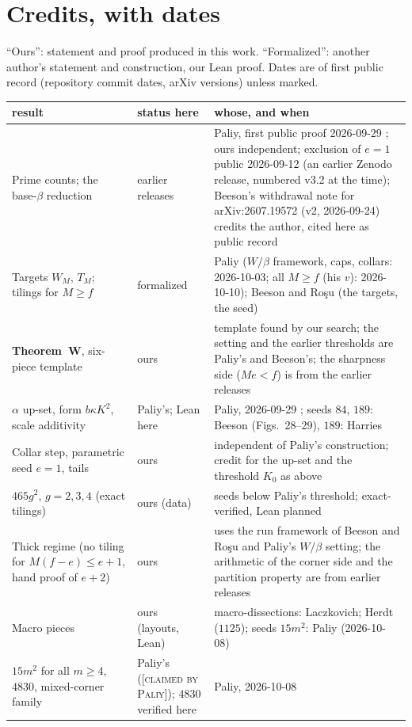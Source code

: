 \documentclass[11pt,reqno]{amsart}
\theoremstyle{plain}
\theoremstyle{definition}
\newcommand{\lab}[1]{\textup{[\textsc{#1}]}}
\newcommand{\CP}{\lab{claimed by Paliy}}
\begin{document}
\section{Credits, with dates}\label{sec:credits}
``Ours'': statement and proof produced in this work. ``Formalized'': another author's statement and construction, our Lean proof. Dates are of first public record (repository commit dates, arXiv versions) unless marked.
\begin{center}
\small
\begin{tabular}{@{}p{4.4cm}p{1.8cm}p{6.4cm}@{}}
\toprule
result & status here & whose, and when\\
\midrule
Prime counts; the base-$\beta$ reduction & earlier releases & Paliy, first public proof 2026-09-29 \cite{PaliyPrime}; ours independent; exclusion of $e=1$ public 2026-09-12 (an earlier Zenodo release, numbered v3.2 at the time); Beeson's withdrawal note for arXiv:2607.19572 (v2, 2026-09-24) \cite{BeesonWithdrawn} credits the author, cited here as public record\\
Targets $W_M$, $T_M$; tilings for $M\ge f$ & formalized & Paliy ($W/\beta$ framework, caps, collars: 2026-10-03; all $M\ge f$ (his $v$): 2026-10-10); Beeson and Ro\c{s}u (the targets, the seed)\\
\textbf{Theorem~W}, six-piece template & ours & template found by our search; the setting and the earlier thresholds are Paliy's and Beeson's; the sharpness side ($Me<f$) is from the earlier releases\\
$\alpha$ up-set, form $b\kappa K^2$, scale additivity & Paliy's; Lean here & Paliy, 2026-09-29 \cite{PaliyRepo}; seeds $84$, $189$: Beeson (Figs.~28--29), $189$: Harries\\
Collar step, parametric seed $e=1$, tails & ours & independent of Paliy's construction; credit for the up-set and the threshold $K_0$ as above\\
$465g^2$, $g=2,3,4$ (exact tilings) & ours (data) & seeds below Paliy's threshold; exact-verified, Lean planned\\
Thick regime (no tiling for $M(f-e)\le e+1$, hand proof of $e+2$) & ours & uses the run framework of Beeson and Ro\c{s}u and Paliy's $W/\beta$ setting; the arithmetic of the corner side and the partition property are from earlier releases\\
Macro pieces & ours (layouts, Lean) & macro-dissections: Laczkovich; Herdt ($1125$); seeds $15m^2$: Paliy (2026-10-08)\\
$15m^2$ for all $m\ge4$, $4830$, mixed-corner family & Paliy's (\CP{}); $4830$ verified here & Paliy, 2026-10-08\\

\end{tabular}
\end{center}
\end{document}
